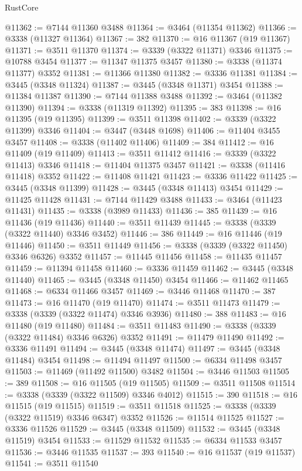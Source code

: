 \begin{lexlean}{RustCore}
\begin{coremodule}
@11362 := @7144 @11360 @3488
@11364 := @3464 (@11354 @11362)
@11366 := @3338 (@11327 @11364)
@11367 := 382
@11370 := @16 @11367 (@19 @11367)
@11371 := @3511 @11370
@11374 := @3339 (@3322 @11371) @3346
@11375 := @10788 @3454
@11377 := @11347 @11375 @3457
@11380 := @3338 (@11374 @11377) @3352
@11381 := @11366 @11380
@11382 := @3336 @11381
@11384 := @3445 (@3348 @11324)
@11387 := @3445 (@3348 @11371) @3454
@11388 := @11384 @11387
@11390 := @7144 @11388 @3488
@11392 := @3464 (@11382 @11390)
@11394 := @3338 (@11319 @11392)
@11395 := 383
@11398 := @16 @11395 (@19 @11395)
@11399 := @3511 @11398
@11402 := @3339 (@3322 @11399) @3346
@11404 := @3447 (@3448 @1698)
@11406 := @11404 @3455 @3457
@11408 := @3338 (@11402 @11406)
@11409 := 384
@11412 := @16 @11409 (@19 @11409)
@11413 := @3511 @11412
@11416 := @3339 (@3322 @11413) @3346
@11418 := @11404 @11375 @3457
@11421 := @3338 (@11416 @11418) @3352
@11422 := @11408 @11421
@11423 := @3336 @11422
@11425 := @3445 (@3348 @11399)
@11428 := @3445 (@3348 @11413) @3454
@11429 := @11425 @11428
@11431 := @7144 @11429 @3488
@11433 := @3464 (@11423 @11431)
@11435 := @3338 (@3989 @11433)
@11436 := 385
@11439 := @16 @11436 (@19 @11436)
@11440 := @3511 @11439
@11445 := @3338 (@3339 (@3322 @11440) @3346 @3452)
@11446 := 386
@11449 := @16 @11446 (@19 @11446)
@11450 := @3511 @11449
@11456 := @3338 (@3339 (@3322 @11450) @3346 @6326) @3352
@11457 := @11445 @11456
@11458 := @11435 @11457
@11459 := @11394 @11458
@11460 := @3336 @11459
@11462 := @3445 (@3348 @11440)
@11465 := @3445 (@3348 @11450) @3454
@11466 := @11462 @11465
@11468 := @6334 @11466 @3457
@11469 := @3446 @11468
@11470 := 387
@11473 := @16 @11470 (@19 @11470)
@11474 := @3511 @11473
@11479 := @3338 (@3339 (@3322 @11474) @3346 @3936)
@11480 := 388
@11483 := @16 @11480 (@19 @11480)
@11484 := @3511 @11483
@11490 := @3338 (@3339 (@3322 @11484) @3346 @6326) @3352
@11491 := @11479 @11490
@11492 := @3336 @11491
@11494 := @3445 (@3348 @11474)
@11497 := @3445 (@3348 @11484) @3454
@11498 := @11494 @11497
@11500 := @6334 @11498 @3457
@11503 := @11469 (@11492 @11500) @3482
@11504 := @3446 @11503
@11505 := 389
@11508 := @16 @11505 (@19 @11505)
@11509 := @3511 @11508
@11514 := @3338 (@3339 (@3322 @11509) @3346 @4012)
@11515 := 390
@11518 := @16 @11515 (@19 @11515)
@11519 := @3511 @11518
@11525 := @3338 (@3339 (@3322 @11519) @3346 @6347) @3352
@11526 := @11514 @11525
@11527 := @3336 @11526
@11529 := @3445 (@3348 @11509)
@11532 := @3445 (@3348 @11519) @3454
@11533 := @11529 @11532
@11535 := @6334 @11533 @3457
@11536 := @3446 @11535
@11537 := 393
@11540 := @16 @11537 (@19 @11537)
@11541 := @3511 @11540

\end{coremodule}
\end{lexlean}
